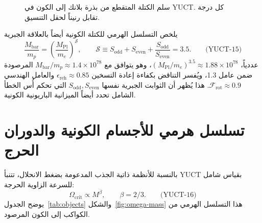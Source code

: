 \documentclass[12pt,a4paper]{article}
\newcommand{\betaf}{\beta}
\newcommand{\Sodd}{S_{\mathrm{odd}}}
\newcommand{\Seven}{S_{\mathrm{even}}}
\newcommand{\Mbar}{M_{\mathrm{bar}}}
\begin{document}
	\begin{otherlanguage}{english}
		\begin{figure}[htbp]
			\centering
			\caption{سلم الكتلة المتقطع من بذرة بلانك إلى الكون في YUCT. كل درجة تقابل رنيناً لحقل التنسيق.}
			\label{fig:hierarchy-scheme}
		\end{figure}
	\end{otherlanguage}
	
	يلخص التسلسل الهرمي للكتلة الكونية أيضاً بالعلاقة الجبرية
	\[
	\boxed{\frac{\Mbar}{m_p} = \left(\frac{M_{\mathrm{Pl}}}{m_e}\right)^{\mathcal{S}}},\qquad
	\mathcal{S} \equiv \Sodd + \Seven + \frac{\Sodd}{\Seven} = 3.5. \qquad\text{(YUCT-15)}
	\]
	عددياً، \((M_{\mathrm{Pl}}/m_e)^{3.5} \approx 1.88\times 10^{78}\)، وهو يتوافق مع \(\Mbar/m_p \approx 1.4\times 10^{78}\) المرصودة ضمن عامل 1.3، ويُفسر التناقض بكفاءة إعادة التسخين \(\epsilon_{\mathrm{reh}}\approx 0.85\) والعامل الهندسي \(\mathcal{F}_{\mathrm{rot}}\approx 0.9\). هذا يُظهر أن الثوابت الجبرية نفسها \(S_{\mathrm{odd}}, S_{\mathrm{even}}\) التي تحكم أُس الخطأ الشامل تحدد أيضاً الميزانية الباريونية الكونية.
	
	\section{تسلسل هرمي للأجسام الكونية والدوران الحرج}
	
	بالنسبة للأنظمة ذاتية الجذب المدعومة بضغط الانحلال، تتنبأ YUCT بقياس شامل للسرعة الزاوية الحرجة:
	\[
	\Omega_{\mathrm{crit}} \propto M^{\betaf},\qquad \betaf = 2/3. \qquad\text{(YUCT-16)}
	\]
	يوضح الجدول~\ref{tab:objects} والشكل~\ref{fig:omega-mass} هذا التسلسل الهرمي من الكواكب إلى الكون المرصود.
	
\end{document}
